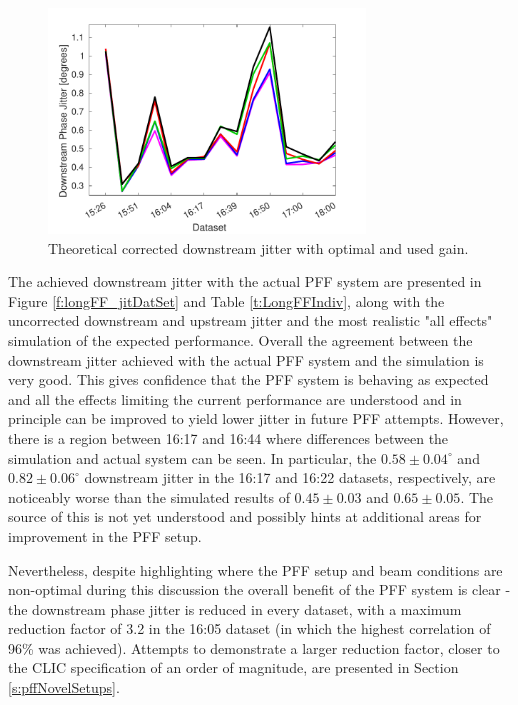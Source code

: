 \begin{figure}
  \centering
  \includegraphics[width=0.75\textwidth]{Figures/feedforward/longFF_datSetJitSim}
  \caption{Theoretical corrected downstream jitter with optimal and used gain.}
  \label{f:longFF_datSetJitSim}
\end{figure}

The achieved downstream jitter with the actual PFF system are presented in Figure \ref{f:longFF_jitDatSet} and Table \ref{t:LongFFIndiv}, along with the uncorrected downstream and upstream jitter and the most realistic "all effects" simulation of the expected performance. Overall the agreement between the downstream jitter achieved with the actual PFF system and the simulation is very good. This gives confidence that the PFF system is behaving as expected and all the effects limiting the current performance are understood and in principle can be improved to yield lower jitter in future PFF attempts. However, there is a region between 16:17 and 16:44 where differences between the simulation and actual system can be seen. In particular, the \(0.58\pm0.04^\circ\) and \(0.82\pm0.06^\circ\) downstream jitter in the 16:17 and 16:22 datasets, respectively, are noticeably worse than the simulated results of \(0.45\pm0.03\) and \(0.65\pm0.05\). The source of this is not yet understood and possibly hints at additional areas for improvement in the PFF setup. 

Nevertheless, despite highlighting where the PFF setup and beam conditions are non-optimal during this discussion the overall benefit of the PFF system is clear - the downstream phase jitter is reduced in every dataset, with a maximum reduction factor of 3.2 in the 16:05 dataset (in which the highest correlation of 96\% was achieved). Attempts to demonstrate a larger reduction factor, closer to the CLIC specification of an order of magnitude, are presented in Section \ref{s:pffNovelSetups}. 

